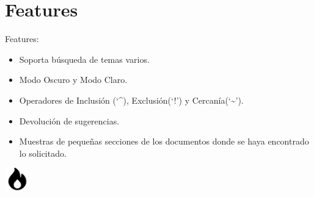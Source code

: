 \section*{Features}

\begin{frame}
    Features:
    \begin{itemize}
        \item Soporta búsqueda de temas varios.
        \item Modo Oscuro y Modo Claro.
        \item Operadores de Inclusión (`\^{}), Exclusión(`!') y Cercanía(`\textasciitilde{}').
        \item Devolución de sugerencias.
        \item Muestras de pequeñas secciones de los documentos donde se haya encontrado lo solicitado.
    \end{itemize}
    \begin{center}
        \includegraphics[width=40px,height=40px]{Assets/Fire.png}
    \end{center}
\end{frame}